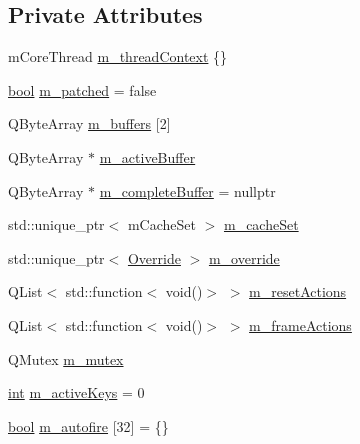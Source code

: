 \subsection*{Private Attributes}
\begin{DoxyCompactItemize}
\item 
m\+Core\+Thread \mbox{\hyperlink{class_q_g_b_a_1_1_core_controller_a32a65a8359b04f6018e856d4518cdf3e}{m\+\_\+thread\+Context}} \{\}
\item 
\mbox{\hyperlink{libretro_8h_a4a26dcae73fb7e1528214a068aca317e}{bool}} \mbox{\hyperlink{class_q_g_b_a_1_1_core_controller_a1dddc3b2b7851c68ca7765b8d5eb049a}{m\+\_\+patched}} = false
\item 
Q\+Byte\+Array \mbox{\hyperlink{class_q_g_b_a_1_1_core_controller_a192682de7b1838b8f903a020b3f04f81}{m\+\_\+buffers}} \mbox{[}2\mbox{]}
\item 
Q\+Byte\+Array $\ast$ \mbox{\hyperlink{class_q_g_b_a_1_1_core_controller_aefb1198dd9b958f4dd810c7649915c0c}{m\+\_\+active\+Buffer}}
\item 
Q\+Byte\+Array $\ast$ \mbox{\hyperlink{class_q_g_b_a_1_1_core_controller_a8a27109b24e82e0cfc39981cce4fba75}{m\+\_\+complete\+Buffer}} = nullptr
\item 
std\+::unique\+\_\+ptr$<$ m\+Cache\+Set $>$ \mbox{\hyperlink{class_q_g_b_a_1_1_core_controller_a671145d12a2f7a0320232e3e8793d303}{m\+\_\+cache\+Set}}
\item 
std\+::unique\+\_\+ptr$<$ \mbox{\hyperlink{class_q_g_b_a_1_1_override}{Override}} $>$ \mbox{\hyperlink{class_q_g_b_a_1_1_core_controller_a81e51511cd709226a1373b13facff630}{m\+\_\+override}}
\item 
Q\+List$<$ std\+::function$<$ void()$>$ $>$ \mbox{\hyperlink{class_q_g_b_a_1_1_core_controller_a6508096dfbb55c94a74b0bf8fccc8fca}{m\+\_\+reset\+Actions}}
\item 
Q\+List$<$ std\+::function$<$ void()$>$ $>$ \mbox{\hyperlink{class_q_g_b_a_1_1_core_controller_a3ec33943f8a370fe2f878b926e4af209}{m\+\_\+frame\+Actions}}
\item 
Q\+Mutex \mbox{\hyperlink{class_q_g_b_a_1_1_core_controller_a4ad82355fb9389ed7ab69bf9ba56fd8b}{m\+\_\+mutex}}
\item 
\mbox{\hyperlink{ioapi_8h_a787fa3cf048117ba7123753c1e74fcd6}{int}} \mbox{\hyperlink{class_q_g_b_a_1_1_core_controller_a4088169fe79aad4c7cecce944340c383}{m\+\_\+active\+Keys}} = 0
\item 
\mbox{\hyperlink{libretro_8h_a4a26dcae73fb7e1528214a068aca317e}{bool}} \mbox{\hyperlink{class_q_g_b_a_1_1_core_controller_af628dbc46bd7113668a4b24b77158da1}{m\+\_\+autofire}} \mbox{[}32\mbox{]} = \{\}

\end{DoxyCompactItemize}

